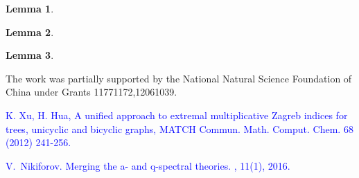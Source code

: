 \documentclass[amsthm]{elsart}
\newtheorem{lemma}{Lemma}[section]
\begin{document}
\begin{lemma}
\end{lemma}

\begin{lemma}
\end{lemma}












\begin{lemma}

\end{lemma}
















\vskip4mm


 The work was partially supported by the National Natural Science Foundation of China under Grants 11771172,12061039.




\begin{thebibliography}{99}









\textcolor{blue}{ K. Xu, H. Hua, A unified approach to extremal
multiplicative Zagreb indices for trees, unicyclic and bicyclic
graphs, MATCH Commun. Math. Comput. Chem. 68 (2012) 241-256.}

\textcolor{blue}{
V.~Nikiforov.
\newblock Merging the a- and q-spectral theories.
, 11(1), 2016.}










\end{thebibliography}
\end{document}

